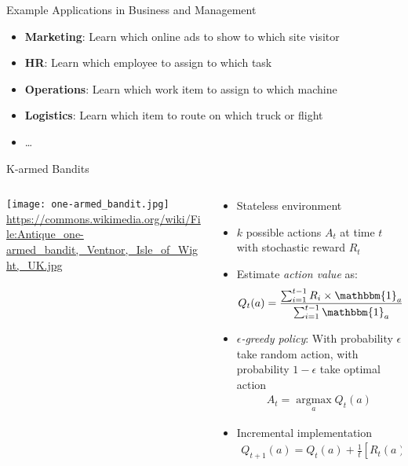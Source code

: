 \documentclass[ignorenonframetext,xcolor=x11names]{beamer}
\begin{document}
\begin{frame}{Example Applications in Business and Management}
\begin{itemize}
  \item \textbf{Marketing}: Learn which online ads to show to which site visitor
  \item \textbf{HR}: Learn which employee to assign to which task
  \item \textbf{Operations}: Learn which work item to assign to which machine
  \item \textbf{Logistics}: Learn which item to route on which truck or flight
  \item \ldots
\end{itemize}
\end{frame}

\begin{frame}{K-armed Bandits}
\begin{columns}
\begin{column}{.2\textwidth}
\texttt{[image: one-armed\_bandit.jpg]}\\
\tiny \url{https://commons.wikimedia.org/wiki/File:Antique_one-armed_bandit,_Ventnor,_Isle_of_Wight,_UK.jpg}
\end{column}
\begin{column}{.8\textwidth}
\small
\begin{itemize} 
   \item Stateless environment
   \item $k$ possible actions $A_t$ at time $t$ with stochastic reward $R_t$
   \item Estimate \emph{action value} as:
   \begin{align*}
   Q_t(a) = \frac{\sum_{i=1}^{t-1} R_i \times \mathbbm{1}_a}{\sum_{i=1}^{t-1} \mathbbm{1}_a} \qquad \text{(average reward)}
   \end{align*} \vspace{-.5\baselineskip}
   \item $\epsilon$\emph{-greedy policy}: With probability $\epsilon$ take random action, with probability $1-\epsilon$ take optimal action
   \begin{align*}
   A_t = \operatorname*{arg max}_a Q_t(a)
   \end{align*} \vspace{-\baselineskip}
   \item Incremental implementation
   \begin{align*}
   Q_{t+1}(a) = Q_t(a) + \frac{1}{t}\left[R_t(a) - Q_t(a)\right]
   \end{align*}
\end{itemize}
\end{column}
\end{columns}
\end{frame}
\end{document}

